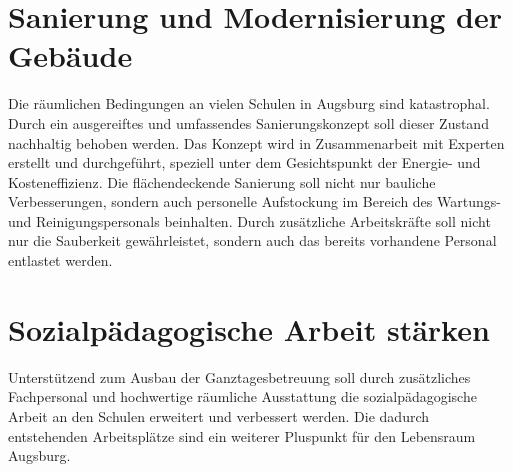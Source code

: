   \section{Sanierung und Modernisierung der Gebäude}
  
  Die räumlichen Bedingungen an vielen Schulen in Augsburg sind katastrophal. 
  Durch ein ausgereiftes und umfassendes Sanierungskonzept soll dieser Zustand 
  nachhaltig behoben werden. Das Konzept wird in Zusammenarbeit mit Experten 
  erstellt und durchgeführt, speziell unter dem Gesichtspunkt der Energie- und 
  Kosteneffizienz. Die flächendeckende Sanierung soll nicht nur bauliche 
  Verbesserungen, sondern auch personelle Aufstockung im Bereich des Wartungs- 
  und Reinigungspersonals beinhalten. Durch zusätzliche Arbeitskräfte soll 
  nicht nur die Sauberkeit gewährleistet, sondern auch das bereits vorhandene 
  Personal entlastet werden.
  
  \section{Sozialpädagogische Arbeit stärken}
  
  Unterstützend zum Ausbau der Ganztagesbetreuung soll durch zusätzliches 
  Fachpersonal und hochwertige räumliche Ausstattung die sozialpädagogische 
  Arbeit an den Schulen erweitert und verbessert werden. Die dadurch 
  entstehenden Arbeitsplätze sind ein weiterer Pluspunkt für den Lebensraum 
  Augsburg.